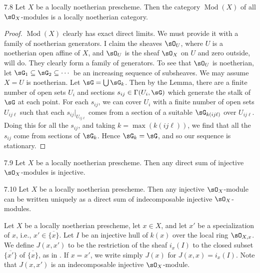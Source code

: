 \begin{booktheorem}{7.8}\label{thm:2.7.8}
Let $X$ be a locally noetherian prescheme. Then the category $\operatorname{Mod}(X)$ of all $\sO_X$-modules is a locally noetherian category.
\end{booktheorem}

\begin{proof}
$\operatorname{Mod}(X)$ clearly has exact direct limits. We must provide it with a family of noetherian generators. I claim the sheaves $\sO_U$, where $U$ is a noetherian open affine of $X$, and $\sO_U$ is the sheaf $\sO_X$ on $U$ and zero outside, will do. They clearly form a family of generators. To see that $\sO_U$ is noetherian, let $\sG_1\subseteq\sG_2\subseteq\cdots$ be an increasing sequence of subsheaves. We may assume $X=U$ is noetherian. Let $\sG=\bigcup\sG_k$. Then by the Lemma, there are a finite number of open sets $U_i$ and sections $s_{ij}\in\Gamma(U_i,\sG)$ which generate the stalk of $\sG$ at each point. For each $s_{ij}$, we can cover $U_i$ with a finite number of open sets $U_{ij\ell}$ such that each $s_{ij}|_{U_{ij\ell}}$ comes from a section of a suitable $\sG_{k(ij\ell)}$ over $U_{ij\ell}$. Doing this for all the $s_{ij}$, and taking $k=\max(k(ij\ell))$, we find that all the $s_{ij}$ come from sections of $\sG_k$. Hence $\sG_k=\sG$, and so our sequence is stationary.
\end{proof}

\begin{bookcorollary}{7.9}\label{cor:2.7.9}
Let $X$ be a locally noetherian prescheme. Then any direct sum of injective $\sO_X$-modules is injective.
\end{bookcorollary}

\begin{bookcorollary}{7.10}\label{cor:2.7.10}
Let $X$ be a locally noetherian prescheme. Then any injective $\sO_X$-module can be written uniquely as a direct sum of indecomposable injective $\sO_X$-modules.
\end{bookcorollary}

\begin{definition*}
Let $X$ be a locally noetherian prescheme, let $x\in X$, and let $x'$ be a specialization of $x$, i.e., $x'\in\overline{\{x\}}$. Let $I$ be an injective hull of $k(x)$ over the local ring $\sO_{X,x}$. We define $J(x,x')$ to be the restriction of the sheaf $i_x(I)$ to the closed subset $\overline{\{x'\}}$ of $\overline{\{x\}}$, as in \cite[\nopp II, Thm.~2.9.1]{G}. If $x=x'$, we write simply $J(x)$ for $J(x,x)=i_x(I)$. Note that $J(x,x')$ is an indecomposable injective $\sO_X$-module.
\end{definition*}

